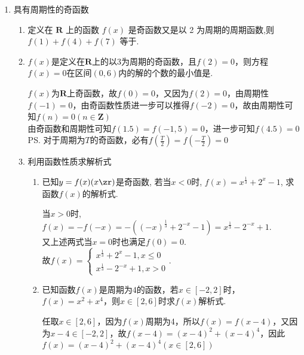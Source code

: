 \begin{enumerate}
\begin{enumerate}
\begin{jieda}
因为$f(x)$关于$(1, 0)$中心对称，当$x \in [1, 2]$时，$f(x) = kx+b$为连续函数，所以$f(1) = 0$ 且在$[0, 2]$上$f(x) = kx+b$. 又因为$f(x)$关于$x = 2$对称，所以$f(3) = f(1)$, 故$f(0) = 8, f\left(\dfrac{1}{2}\right) = 4, f\left(\dfrac{3}{2}\right) = -4$，即$f\left(\dfrac{8k+1}{2}\right) = 4, f\left(\dfrac{8k+3}{2}\right) = -4, f\left(\dfrac{8k+5}{2}\right) = -4, f\left(\dfrac{8k+7}{2}\right) = 4 (k \in \mathbf{Z})$. 因此$f\left(\dfrac{2025}{2}\right) = 4$ \\
\ps 如果对称中心的横坐标在定义域内，则对称中心在函数图象上，如果对称中心横坐标不在定义域内，则对称中心不在函数图象上；
\end{jieda}
\end{enumerate}
\item 具有周期性的奇函数
\begin{enumerate}
    \item 定义在 $\mathbf{R}$ 上的函数 $f\left( x\right)$ 是奇函数又是以 2 为周期的周期函数,则 $f\left( 1\right)  + f\left( 4\right)  + f\left( 7\right)$ 等于.
    \item $f(x)$是定义在$\mathbf{R}$上的以3为周期的奇函数，且$f(2) = 0$，则方程$f(x) = 0$在区间$(0, 6)$内的解的个数的最小值是. 
    \begin{jieda}
        $f(x)$为$\mathbf{R}$上奇函数，故$f(0) = 0$，又因为$f(2) = 0$，由周期性$f(-1) = 0$，由奇函数性质进一步可以推得$f(-2) = 0$，故由周期性可知$f(n) = 0 (n \in \mathbf{Z})$ \\
        由奇函数和周期性可知$f(1.5) = f(-1,5) = 0$，进一步可知$f(4.5) = 0$ \\
        \ps 对于周期为$T$的奇函数，必有$f(\frac{T}{2}) = f(-\frac{T}{2}) = 0$
    \end{jieda}
\item 利用函数性质求解析式
\begin{enumerate}
    \item 已知$y=f(x)(x\zr)$是奇函数, 若当$x<0$时, $f(x)=x^{\frac{1}{3}}+2^x-1$, 求函数$f(x)$的解析式.
    \begin{jieda}
    当$x>0$时, $f(x)=-f(-x)=-((-x)^{\frac{1}{3}}+2^{-x}-1)=x^{\frac{1}{3}}-2^{-x}+1$. \\
    又上述两式当$x=0$时也满足$f(0)=0$.  \\
    故$f(x) = \begin{cases}
    x^{\frac{1}{3}}+2^x-1, x\leq 0\\
    x^{\frac{1}{3}}-2^{-x}+1, x>0
    \end{cases}$. 
    \end{jieda}
    \item 已知函数$f(x)$是周期为$4$的函数，若$x \in [-2, 2]$时，$f(x) = x^2 + x^4$，则$x \in [2, 6]$时求$f(x)$解析式.
    \begin{jieda}
        任取$x \in [2, 6]$，因为$f(x)$周期为4，所以$f(x) = f(x - 4)$，又因为$x - 4 \in [-2, 2]$，故$f(x-4) = (x-4)^2 + (x-4)^4$，因此$f(x) = (x-4)^2 + (x-4)^4 (x \in [2, 6])$ 
    \end{jieda}
\end{enumerate}
\end{enumerate}
\end{enumerate}